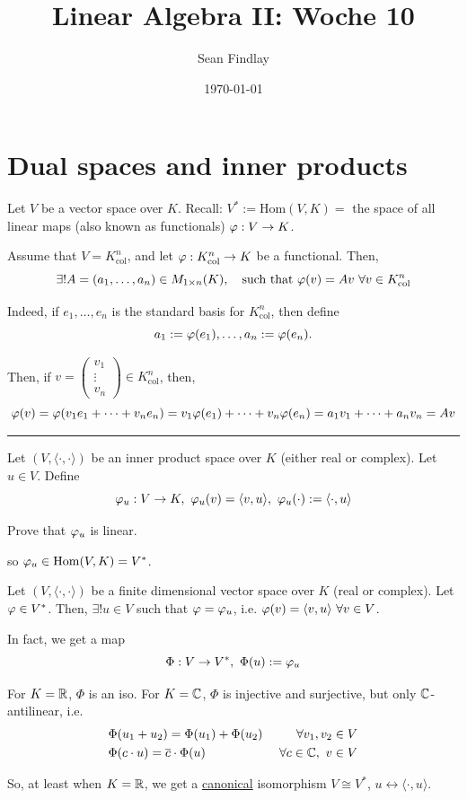 \documentclass[12pt]{article}
\title{Linear Algebra II: Woche 10}
\author{Sean Findlay}
\date{\today}
\begin{document}
\maketitle

\section{Dual spaces and inner products}

Let $V$ be a vector space over $K$. Recall: $V^* := \mathrm{Hom}(V, K) = $ the space of all linear maps (also known as functionals) $\varphi: V \rightarrow K$.

Assume that $V = K_\text{col}^n$, and let $\varphi: K_\text{col}^n \rightarrow K$ be a functional. Then,
$$
    \exists! A = (a_1,\dots,a_n) \in M_{1 \times n}(K),\quad \text{such that } \varphi(v) = Av \ \forall v\in K_\text{col}^n
$$

Indeed, if $e_1,\dots,e_n$ is the standard basis for $K_\text{col}^n$, then define
$$
    a_1 := \varphi(e_1),\dots,a_n:=\varphi(e_n).
$$

Then, if $v = \begin{pmatrix} v_1 \\ \vdots \\ v_n \end{pmatrix} \in K_\text{col}^n$, then,
$$
    \varphi(v) = \varphi(v_1e_1 + \dots + v_ne_n) = v_1\varphi(e_1) + \dots + v_n \varphi(e_n) = a_1v_1 + \dots + a_nv_n = A v
$$

\hrule

Let $(V, \langle \cdot, \cdot \rangle)$ be an inner product space over $K$ (either real or complex). Let $u \in V$. Define 
$$
    \vphi_u: V \rightarrow K,\ \vphi_u(v) = \langle v, u \rangle,\ \vphi_u(\cdot) := \langle \cdot, u \rangle
$$

\begin{exercise}{}{}
    Prove that $\varphi_u$ is linear.
\end{exercise}

so $\varphi_u \in \mathrm{Hom}(V, K) = V^*$.

\begin{theorem}{}{}
    Let $(V, \langle \cdot, \cdot \rangle)$ be a finite dimensional vector space over $K$ (real or complex). Let $\varphi \in V^*$. Then, $\exists! u \in V$ such that $\varphi = \varphi_u$, i.e. $\varphi(v) = \langle v, u \rangle \ \forall v \in V$.

    In fact, we get a map 
    $$
        \Phi: V \rightarrow V^*,\ \Phi(u) := \varphi_u
    $$

    For $K = \mathbb{R}$, $\Phi$ is an iso. For $K = \mathbb{C}$, $\Phi$ is injective and surjective, but only $\mathbb{C}$-antilinear, i.e.
    $$
    \begin{aligned}
        &\Phi(u_1 + u_2) = \Phi(u_1) + \Phi(u_2) \ &\forall v_1,v_2 \in V \\
        &\Phi(c \cdot u) = \overline{c} \cdot \Phi(u) \ &\forall c \in \mathbb{C},\ v \in V
    \end{aligned}
    $$

    So, at least when $K = \mathbb{R}$, we get a \underline{canonical} isomorphism $V \cong V^*$, $u \longleftrightarrow \langle \cdot, u \rangle$.
\end{theorem}
\end{document}
